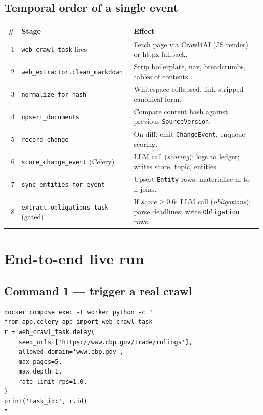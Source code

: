 \documentclass[11pt,a4paper]{article}
\begin{document}
\subsection{Temporal order of a single event}

\begin{center}
\small
\begin{tabularx}{\linewidth}{@{}rlX@{}}
\toprule
\# & \textbf{Stage} & \textbf{Effect} \\
\midrule
1 & \texttt{web\_crawl\_task} fires            & Fetch page via Crawl4AI (JS render) or httpx fallback. \\
2 & \texttt{web\_extractor.clean\_markdown}    & Strip boilerplate, nav, breadcrumbs, tables of contents. \\
3 & \texttt{normalize\_for\_hash}              & Whitespace-collapsed, link-stripped canonical form. \\
4 & \texttt{upsert\_documents}                 & Compare content hash against previous \texttt{SourceVersion}. \\
5 & \texttt{record\_change}                    & On diff: emit \texttt{ChangeEvent}, enqueue scoring. \\
6 & \texttt{score\_change\_event} (Celery)     & LLM call (\textit{scoring}); logs to ledger; writes score, topic, entities. \\
7 & \texttt{sync\_entities\_for\_event}        & Upsert \texttt{Entity} rows, materialise m-to-n joins. \\
8 & \texttt{extract\_obligations\_task} (gated) & If $score \geq 0.6$: LLM call (\textit{obligations}); parse deadlines; write \texttt{Obligation} rows. \\
\bottomrule
\end{tabularx}
\end{center}

\section{End-to-end live run}

\subsection{Command 1 --- trigger a real crawl}

\begin{lstlisting}[style=shell]
docker compose exec -T worker python -c "
from app.celery_app import web_crawl_task
r = web_crawl_task.delay(
    seed_urls=['https://www.cbp.gov/trade/rulings'],
    allowed_domain='www.cbp.gov',
    max_pages=5,
    max_depth=1,
    rate_limit_rps=1.0,
)
print('task_id:', r.id)
"
\end{lstlisting}
\end{document}
